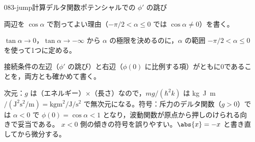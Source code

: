\documentclass[uplatex,dvipdfmx,a4paper,11pt]{jsarticle}
\begin{document}
\begin{mondai}{083-jump}{計算}{デルタ関数ポテンシャルでの $\phi'$ の跳び}
\begin{tadashii}
\begin{ronten}
  \item {} 両辺を $\cos\alpha$ で割ってよい理由（$-\pi/2<\alpha\le 0$ では $\cos\alpha\ne 0$）を書く。
  \item {} $\tan\alpha\to 0$，$\tan\alpha\to-\infty$ から $\alpha$ の極限を決めるのに，$\alpha$ の範囲 $-\pi/2<\alpha\le 0$ を使って1つに定める。
  \item {} 接続条件の左辺（$\phi'$ の跳び）と右辺（$\phi(0)$ に比例する項）がともに0であることを，両方とも確かめて書く。
\end{ronten}
\kenzan 次元：$g$ は（エネルギー）$\times$（長さ）なので，$mg/(\hbar^{2}k)$ は \unit{\kilogram\joule\metre}$/(\unit{\joule\squared\second\squared\per\metre})=\unit{\kilogram\metre\squared\per\joule\per\second\squared}$ で無次元になる。符号：斥力のデルタ関数（$g>0$）では $\alpha<0$ で $\phi(0)=\cos\alpha<1$ となり，波動関数が原点から押しのけられる向きで妥当である。
\tsumazuki $x<0$ 側の傾きの符号を誤りやすい。$\abs{x}=-x$ と書き直してから微分する。
\end{tadashii}
\end{mondai}
\end{document}
